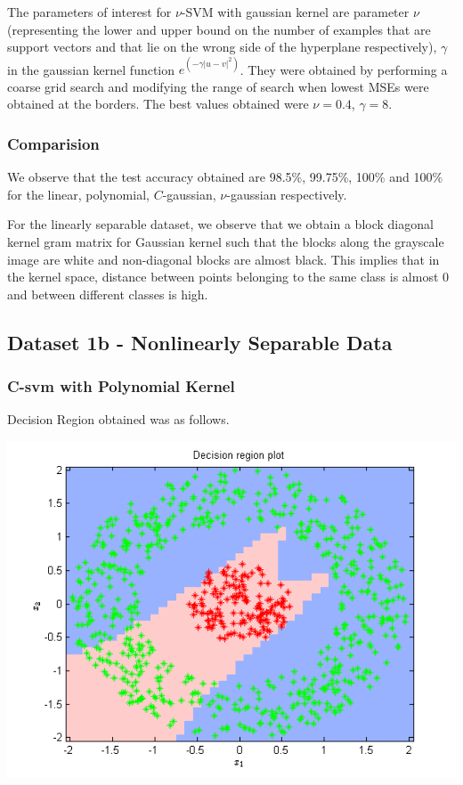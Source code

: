 \documentclass{article}
\begin{document}
The parameters of interest for $\nu$-SVM with gaussian kernel are parameter $\nu$(representing the lower and upper bound on the number of examples that are support vectors and that lie on the wrong side of the hyperplane respectively), $\gamma$ in the gaussian kernel function $e^{(-\gamma|u-v|^{2})}$. They were obtained by performing a coarse grid search and modifying the range of search when lowest MSEs were obtained at the borders.
The best values obtained were $\nu=0.4$, $\gamma=8$.

\subsubsection{Comparision}
We observe that the test accuracy obtained are 98.5\%, 99.75\%, 100\% and 100\% for the linear, polynomial, $C$-gaussian, $\nu$-gaussian respectively. 

For the linearly separable dataset, we observe that we obtain a block diagonal kernel gram matrix for Gaussian kernel such that the blocks along the grayscale image are white and non-diagonal blocks are almost black. This implies that in the kernel space, distance between points belonging to the same class is almost 0 and between different classes is high.

\newpage
\subsection{Dataset 1b - Nonlinearly Separable Data}


\subsubsection{C-svm with Polynomial Kernel}

Decision Region obtained was as follows.
\begin{center}
\includegraphics[scale=1]{Classification/1b/c_poly/dec}
\end{center}
\end{document}
